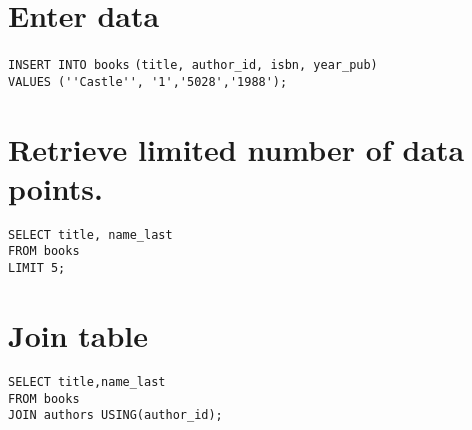 \documentclass{article}
\begin{document}
\section{Enter data}
\verb|INSERT INTO books|
\verb|(title, author_id, isbn, year_pub)|\\

\verb|VALUES (''Castle'', '1','5028','1988');|

\newpage

\section{Retrieve limited number of data points.}
\verb|SELECT title, name_last|\\
\verb|FROM books|\\
\verb|LIMIT 5;|

\section{Join table}
\verb|SELECT title,name_last|\\
\verb|FROM books|\\
\verb|JOIN authors USING(author_id);|
\end{document}
